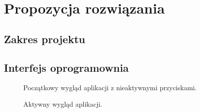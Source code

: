 \documentclass[twoside,a4paper]{book}
\begin{document}
\section{Propozycja rozwiązania}
\subsection{Zakres projektu}

\subsection{Interfejs oprogramownia}
\begin{figure}[!h]
		\centering
		\caption{Początkowy wygląd aplikacji z nieaktywnymi przyciskami. }
		\label{fig:inactive}
\end{figure}
\begin{figure}[!h]
		\centering
		\caption{Aktywny wygląd aplikacji. }
		\label{fig:active}
\end{figure}
\end{document}
